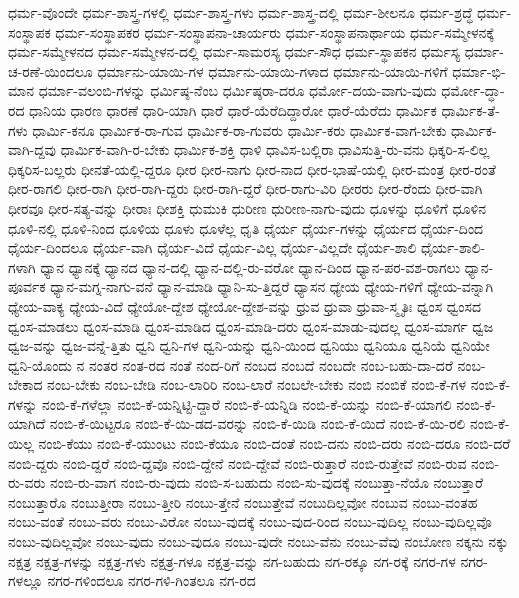 {ಧರ್ಮ-ವೊಂದೇ
ಧರ್ಮ-ಶಾಸ್ತ್ರ-ಗಳಲ್ಲಿ
ಧರ್ಮ-ಶಾಸ್ತ್ರ-ಗಳು
ಧರ್ಮ-ಶಾಸ್ತ್ರ-ದಲ್ಲಿ
ಧರ್ಮ-ಶೀಲನೂ
ಧರ್ಮ-ಶ್ರದ್ಧೆ
ಧರ್ಮ-ಸಂಸ್ಥಾಪಕ
ಧರ್ಮ-ಸಂಸ್ಥಾಪಕರ
ಧರ್ಮ-ಸಂಸ್ಥಾಪನಾ-ಚಾರ್ಯರು
ಧರ್ಮ-ಸಂಸ್ಥಾಪನಾರ್ಥಾಯ
ಧರ್ಮ-ಸಮ್ಮೇಳನಕ್ಕೆ
ಧರ್ಮ-ಸಮ್ಮೇಳನದ
ಧರ್ಮ-ಸಮ್ಮೇಳನ-ದಲ್ಲಿ
ಧರ್ಮ-ಸಾಮರಸ್ಯ
ಧರ್ಮ-ಸೌಧ
ಧರ್ಮ-ಸ್ಥಾಪಕನ
ಧರ್ಮಸ್ಯ
ಧರ್ಮಾ-ಚ-ರಣೆ-ಯಿಂದಲೂ
ಧರ್ಮಾನು-ಯಾಯಿ-ಗಳ
ಧರ್ಮಾನು-ಯಾಯಿ-ಗಳಾದ
ಧರ್ಮಾನು-ಯಾಯಿ-ಗಳಿಗೆ
ಧರ್ಮಾ-ಭಿ-ಮಾನ
ಧರ್ಮಾ-ವಲಂಬಿ-ಗಳನ್ನು
ಧರ್ಮಿಷ್ಠ-ನೆಂಬ
ಧರ್ಮಿಷ್ಠರಾ-ದರೂ
ಧರ್ಮೋ-ದಯ-ವಾಗು-ವುದು
ಧರ್ಮೋ-ದ್ಧಾ-ರದ
ಧಾನಿಯ
ಧಾರಣ
ಧಾರಣೆ
ಧಾರಿ-ಯಾಗಿ
ಧಾರೆ
ಧಾರೆ-ಯೆರೆದಿದ್ದಾರೋ
ಧಾರೆ-ಯೆರೆದು
ಧಾರ್ಮಿಕ
ಧಾರ್ಮಿಕ-ತೆ-ಗಳು
ಧಾರ್ಮಿ-ಕನೂ
ಧಾರ್ಮಿಕ-ರಾ-ಗುವ
ಧಾರ್ಮಿಕ-ರಾ-ಗುವರು
ಧಾರ್ಮಿ-ಕರು
ಧಾರ್ಮಿಕ-ವಾಗ-ಬೇಕು
ಧಾರ್ಮಿಕ-ವಾಗಿ-ದ್ದವು
ಧಾರ್ಮಿಕ-ವಾಗಿ-ರ-ಬೇಕು
ಧಾರ್ಮಿಕ-ಶಕ್ತಿ
ಧಾಳಿ
ಧಾವಿಸ-ಬಲ್ಲಿರಾ
ಧಾವಿಸುತ್ತಿ-ರು-ವನು
ಧಿಕ್ಕರಿ-ಸ-ಲಿಲ್ಲ
ಧಿಕ್ಕರಿಸ-ಬಲ್ಲರು
ಧೀನತೆ-ಯಲ್ಲಿ-ದ್ದರೂ
ಧೀರ
ಧೀರ-ನಾಗು
ಧೀರ-ನಾದ
ಧೀರ-ಭಾಷೆ-ಯಲ್ಲಿ
ಧೀರ-ಮಂತ್ರ
ಧೀರ-ರಂತೆ
ಧೀರ-ರಾಗಲಿ
ಧೀರ-ರಾಗಿ
ಧೀರ-ರಾಗಿ-ದ್ದರು
ಧೀರ-ರಾಗಿ-ದ್ದರೆ
ಧೀರ-ರಾಗು-ವಿರಿ
ಧೀರರು
ಧೀರ-ರೆಂದು
ಧೀರ-ವಾಗಿ
ಧೀರವೂ
ಧೀರ-ಸತ್ಯ-ವನ್ನು
ಧೀರಾಃ
ಧೀಶಕ್ತಿ
ಧುಮುಕಿ
ಧುರೀಣ
ಧುರೀಣ-ನಾಗು-ವುದು
ಧೂಳನ್ನು
ಧೂಳಿಗೆ
ಧೂಳಿನ
ಧೂಳಿ-ನಲ್ಲಿ
ಧೂಳಿ-ನಿಂದ
ಧೂಳಿಯ
ಧೂಳು
ಧೂಳೆಲ್ಲ
ಧೃತಿ
ಧೈರ್ಯ
ಧೈರ್ಯ-ಗಳನ್ನು
ಧೈರ್ಯದ
ಧೈರ್ಯ-ದಿಂದ
ಧೈರ್ಯ-ದಿಂದಲೂ
ಧೈರ್ಯ-ವಾಗಿ
ಧೈರ್ಯ-ವಿದೆ
ಧೈರ್ಯ-ವಿಲ್ಲ
ಧೈರ್ಯ-ವಿಲ್ಲದೇ
ಧೈರ್ಯ-ಶಾಲಿ
ಧೈರ್ಯ-ಶಾಲಿ-ಗಳಾಗಿ
ಧ್ಯಾನ
ಧ್ಯಾನಕ್ಕೆ
ಧ್ಯಾನದ
ಧ್ಯಾನ-ದಲ್ಲಿ
ಧ್ಯಾನ-ದಲ್ಲಿ-ರು-ವರೋ
ಧ್ಯಾನ-ದಿಂದ
ಧ್ಯಾನ-ಪರ-ವಶ-ರಾಗಲು
ಧ್ಯಾನ-ಪೂರ್ವಕ
ಧ್ಯಾನ-ಮಗ್ನ-ನಾಗು-ವನೆ
ಧ್ಯಾನ-ಮಾಡಿ
ಧ್ಯಾನಿ-ಸು-ತ್ತಿದ್ದರೆ
ಧ್ಯಾಸನ
ಧ್ಯೇಯ
ಧ್ಯೇಯ-ಗಳಿಗೆ
ಧ್ಯೇಯ-ವನ್ನಾಗಿ
ಧ್ಯೇಯ-ವಾಕ್ಯ
ಧ್ಯೇಯ-ವಿದೆ
ಧ್ಯೇಯೋ-ದ್ದೇಶ
ಧ್ಯೇಯೋ-ದ್ದೇಶ-ವನ್ನು
ಧ್ರುವ
ಧ್ರುವಾ
ಧ್ರುವಾ-ಸ್ಮೃತಿಃ
ಧ್ವಂಸ
ಧ್ವಂಸದ
ಧ್ವಂಸ-ಮಾಡಲು
ಧ್ವಂಸ-ಮಾಡಿ
ಧ್ವಂಸ-ಮಾಡಿದ
ಧ್ವಂಸ-ಮಾಡಿ-ದರು
ಧ್ವಂಸ-ಮಾಡು-ವುದಲ್ಲ
ಧ್ವಂಸ-ಮಾರ್ಗ
ಧ್ವಜ
ಧ್ವಜ-ವನ್ನು
ಧ್ವಜ-ವನ್ನೆ-ತ್ತಿತು
ಧ್ವನಿ
ಧ್ವನಿ-ಗಳ
ಧ್ವನಿ-ಯನ್ನು
ಧ್ವನಿ-ಯಿಂದ
ಧ್ವನಿಯು
ಧ್ವನಿಯೂ
ಧ್ವನಿಯೆ
ಧ್ವನಿಯೇ
ಧ್ವನಿ-ಯೊಂದು
ನ
ನಂತರ
ನಂತ-ರದ
ನಂತೆ
ನಂದ-ರಿಗೆ
ನಂಬದ
ನಂಬದೆ
ನಂಬದೇ
ನಂಬ-ಬಹು-ದಾ-ದರೆ
ನಂಬ-ಬೇಕಾದ
ನಂಬ-ಬೇಕು
ನಂಬ-ಬೇಡಿ
ನಂಬ-ಲಾರಿರಿ
ನಂಬ-ಲಾರೆ
ನಂಬಲೇ-ಬೇಕು
ನಂಬಿ
ನಂಬಿಕೆ
ನಂಬಿ-ಕೆ-ಗಳ
ನಂಬಿ-ಕೆ-ಗಳನ್ನು
ನಂಬಿ-ಕೆ-ಗಳೆಲ್ಲಾ
ನಂಬಿ-ಕೆ-ಯನ್ನಿಟ್ಟಿ-ದ್ದಾರೆ
ನಂಬಿ-ಕೆ-ಯನ್ನಿಡಿ
ನಂಬಿ-ಕೆ-ಯನ್ನು
ನಂಬಿ-ಕೆ-ಯಾಗಲಿ
ನಂಬಿ-ಕೆ-ಯಾಗಿದೆ
ನಂಬಿ-ಕೆ-ಯಿಟ್ಟರೂ
ನಂಬಿ-ಕೆ-ಯಿ-ಡದ-ವರನ್ನು
ನಂಬಿ-ಕೆ-ಯಿಡಿ
ನಂಬಿ-ಕೆ-ಯಿದೆ
ನಂಬಿ-ಕೆ-ಯಿ-ರಲಿ
ನಂಬಿ-ಕೆ-ಯಿಲ್ಲ
ನಂಬಿ-ಕೆಯು
ನಂಬಿ-ಕೆ-ಯುಂಟು
ನಂಬಿ-ಕೆಯೂ
ನಂಬಿ-ದಂತೆ
ನಂಬಿ-ದನು
ನಂಬಿ-ದರು
ನಂಬಿ-ದರೂ
ನಂಬಿ-ದರೆ
ನಂಬಿ-ದ್ದರು
ನಂಬಿ-ದ್ದರೆ
ನಂಬಿ-ದ್ದವೊ
ನಂಬಿ-ದ್ದೇನೆ
ನಂಬಿ-ದ್ದೇವೆ
ನಂಬಿ-ರುತ್ತಾರೆ
ನಂಬಿ-ರುತ್ತೇವೆ
ನಂಬಿ-ರುವ
ನಂಬಿ-ರು-ವರು
ನಂಬಿ-ರು-ವಾಗ
ನಂಬಿ-ರು-ವುದು
ನಂಬಿ-ಸ-ಬಹುದು
ನಂಬಿ-ಸು-ವುದಕ್ಕೆ
ನಂಬುತ್ತಾ-ನೆಯೊ
ನಂಬುತ್ತಾರೆ
ನಂಬುತ್ತಾರೊ
ನಂಬುತ್ತೀರಾ
ನಂಬು-ತ್ತೀರಿ
ನಂಬು-ತ್ತೇನೆ
ನಂಬುತ್ತೇವೆ
ನಂಬುದಿಲ್ಲವೋ
ನಂಬುವ
ನಂಬು-ವಂತಹ
ನಂಬು-ವಂತೆ
ನಂಬು-ವರು
ನಂಬು-ವಿರೋ
ನಂಬು-ವುದಕ್ಕೆ
ನಂಬು-ವುದ-ರಿಂದ
ನಂಬು-ವುದಿಲ್ಲ
ನಂಬು-ವುದಿಲ್ಲವೊ
ನಂಬು-ವುದಿಲ್ಲವೋ
ನಂಬು-ವುದು
ನಂಬು-ವುದೂ
ನಂಬು-ವುದೇ
ನಂಬು-ವೆನು
ನಂಬು-ವೆವು
ನಂಬೋಣ
ನಕ್ಕನು
ನಕ್ಕು
ನಕ್ಷತ್ರ
ನಕ್ಷತ್ರ-ಗಳನ್ನು
ನಕ್ಷತ್ರ-ಗಳು
ನಕ್ಷತ್ರ-ಗಳೂ
ನಕ್ಷತ್ರ-ವನ್ನು
ನಗ-ಬಹುದು
ನಗ-ರಕ್ಕೂ
ನಗ-ರಕ್ಕೆ
ನಗರ-ಗಳ
ನಗರ-ಗಳಲ್ಲೂ
ನಗರ-ಗಳಿಂದಲೂ
ನಗರ-ಗಳಿ-ಗಿಂತಲೂ
ನಗ-ರದ
}
